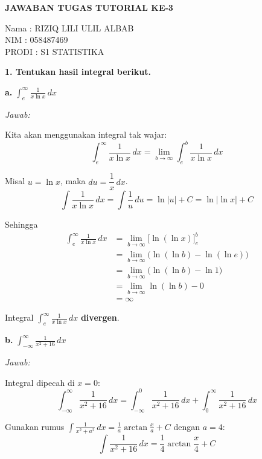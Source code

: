 \documentclass[12pt,a4paper]{article}
\begin{document}
\begin{center}
\textbf{JAWABAN TUGAS TUTORIAL KE-3}\\
\end{center}

\vspace{2mm}
Nama : RIZIQ LILI ULIL ALBAB \\
NIM \hspace{2.5mm}: 058487469 \\
PRODI : S1 STATISTIKA \\

\vspace{10mm}

\textbf{1. Tentukan hasil integral berikut.}

\textbf{a.} $\displaystyle \int_{e}^{\infty} \frac{1}{x\ln x}\,dx$

\textit{Jawab:}

Kita akan menggunakan integral tak wajar:
\[
\int_{e}^{\infty} \frac{1}{x\ln x}\,dx = \lim_{b\to\infty} \int_{e}^{b} \frac{1}{x\ln x}\,dx
\]

Misal $u = \ln x$, maka $du = \dfrac{1}{x}\,dx$.
\[
\int \frac{1}{x\ln x}\,dx = \int \frac{1}{u}\,du = \ln|u| + C = \ln|\ln x| + C
\]

Sehingga
\begin{align*}
\int_{e}^{\infty} \frac{1}{x\ln x}\,dx
&= \lim_{b\to\infty} \Big[\ln(\ln x)\Big]_{e}^{b} \\
&= \lim_{b\to\infty} \big(\ln(\ln b) - \ln(\ln e)\big) \\
&= \lim_{b\to\infty} \big(\ln(\ln b) - \ln 1\big) \\
&= \lim_{b\to\infty} \ln(\ln b) - 0 \\
&= \infty
\end{align*}

Integral $\displaystyle \int_{e}^{\infty} \frac{1}{x\ln x}\,dx$ \textbf{divergen}.

\vspace{4mm}
\textbf{b.} $\displaystyle \int_{-\infty}^{\infty} \frac{1}{x^2+16}\,dx$

\textit{Jawab:}

Integral dipecah di $x = 0$:
\[
\int_{-\infty}^{\infty} \frac{1}{x^2+16}\,dx
= \int_{-\infty}^{0} \frac{1}{x^2+16}\,dx + \int_{0}^{\infty} \frac{1}{x^2+16}\,dx
\]

Gunakan rumus $\displaystyle \int \frac{1}{x^2+a^2}\,dx = \frac{1}{a}\arctan\frac{x}{a} + C$ dengan $a = 4$:
\[
\int \frac{1}{x^2+16}\,dx = \frac{1}{4}\arctan\frac{x}{4} + C
\]
\end{document}
